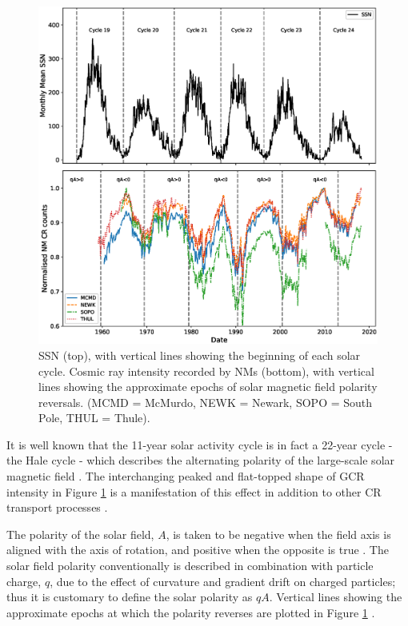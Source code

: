 \begin{figure}
	\includegraphics[width=\columnwidth]{timeseries.eps}
	\caption{SSN (top), with vertical lines showing the beginning of each solar cycle. Cosmic ray intensity recorded by NMs (bottom), with vertical lines showing the approximate epochs of solar magnetic field polarity reversals.
		(MCMD = McMurdo, NEWK = Newark, SOPO = South Pole, THUL = Thule).}
	\label{fig:CR_SSN_timeseries}
\end{figure}


It is well known that the 11-year solar activity cycle is in fact a 22-year cycle -  the Hale cycle - which describes the alternating polarity of the large-scale solar magnetic field  \citep{thomas_22-year_2014}. The interchanging peaked and flat-topped shape of GCR intensity in Figure \ref{fig:CR_SSN_timeseries} is a manifestation of this effect in addition to other CR transport processes \citep{aslam_solar_2012}.

The polarity of the solar field, $A$, is taken to be negative when the field axis is aligned with the axis of rotation, and positive when the opposite is true \citep{thomas_22-year_2014}. The solar field polarity conventionally is described in combination with particle charge, $q$, due to the effect of curvature and gradient drift on charged particles; thus it is customary to define the solar polarity as $qA$. Vertical lines showing the approximate epochs at which the polarity reverses are plotted in Figure \ref{fig:CR_SSN_timeseries} \citep{janardhan_solar_2018, thomas_22-year_2014}. 

